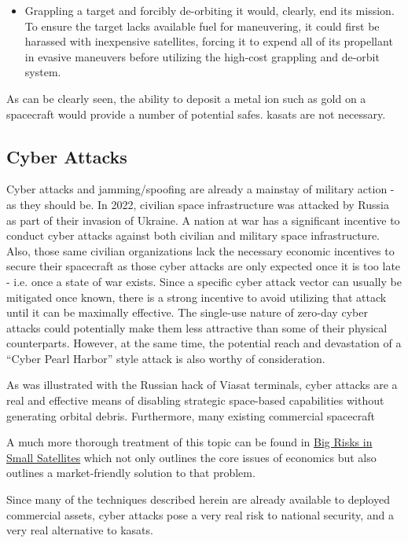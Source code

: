\begin{itemize}
\item Grappling a target and forcibly de-orbiting it would, clearly,
  end its mission.  To ensure the target lacks available fuel for
  maneuvering, it could first be harassed with inexpensive satellites,
  forcing it to expend all of its propellant in evasive maneuvers
  before utilizing the high-cost grappling and de-orbit system.

\end{itemize}

As can be clearly seen, the ability to deposit a metal ion such as
gold on a spacecraft would provide a number of potential \acp{safe}.
\acp{kasat} are not necessary.


\subsection{Cyber Attacks}

Cyber attacks and jamming/spoofing are already a mainstay of military
action - as they should be.  In 2022, civilian space infrastructure
was attacked by Russia as part of their invasion of Ukraine.  A nation
at war has a significant incentive to conduct cyber attacks against
both civilian and military space infrastructure.\cite{big-risks} Also,
those same civilian organizations lack the necessary economic
incentives to secure their spacecraft as those cyber attacks are only
expected once it is too late - i.e. once a state of war exists.  Since
a specific cyber attack vector can usually be mitigated once known,
there is a strong incentive to avoid utilizing that attack until it
can be maximally effective.  The single-use nature of zero-day cyber
attacks could potentially make them less attractive than some of their
physical counterparts.  However, at the same time, the potential reach
and devastation of a ``Cyber Pearl Harbor'' style attack is also
worthy of consideration.

As was illustrated with the Russian hack of Viasat terminals, cyber
attacks are a real and effective means of disabling strategic
space-based capabilities without generating orbital debris.
Furthermore, many existing commercial spacecraft 

A much more thorough treatment of this topic can be found in
\href{https://www.researchgate.net/publication/341435541_Big_Risks_in_Small_Satellites_-_The_Need_for_Secure_Infrastructure_as_a_Service}{Big
  Risks in Small Satellites} which not only outlines the core issues
of economics but also outlines a market-friendly solution to that
problem.

Since many of the techniques described herein are already available to
deployed commercial assets, cyber attacks pose a very real risk to
national security, and a very real alternative to \acp{kasat}.
